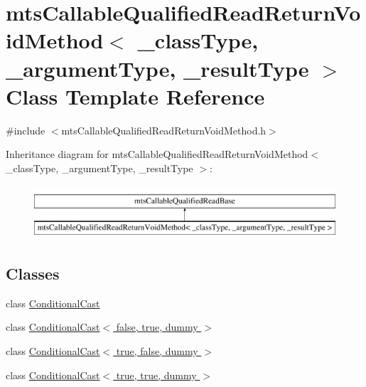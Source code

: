 \hypertarget{classmts_callable_qualified_read_return_void_method}{}\section{mts\+Callable\+Qualified\+Read\+Return\+Void\+Method$<$ \+\_\+class\+Type, \+\_\+argument\+Type, \+\_\+result\+Type $>$ Class Template Reference}
\label{classmts_callable_qualified_read_return_void_method}


{\ttfamily \#include $<$mts\+Callable\+Qualified\+Read\+Return\+Void\+Method.\+h$>$}

Inheritance diagram for mts\+Callable\+Qualified\+Read\+Return\+Void\+Method$<$ \+\_\+class\+Type, \+\_\+argument\+Type, \+\_\+result\+Type $>$\+:\begin{figure}[H]
\begin{center}
\leavevmode
\includegraphics[height=2.000000cm]{d6/dcd/classmts_callable_qualified_read_return_void_method}
\end{center}
\end{figure}
\subsection*{Classes}
\begin{DoxyCompactItemize}
\item 
class \hyperlink{classmts_callable_qualified_read_return_void_method_1_1_conditional_cast}{Conditional\+Cast}
\item 
class \hyperlink{classmts_callable_qualified_read_return_void_method_1_1_conditional_cast_3_01false_00_01true_00_01dummy_01_4}{Conditional\+Cast$<$ false, true, dummy $>$}
\item 
class \hyperlink{classmts_callable_qualified_read_return_void_method_1_1_conditional_cast_3_01true_00_01false_00_01dummy_01_4}{Conditional\+Cast$<$ true, false, dummy $>$}
\item 
class \hyperlink{classmts_callable_qualified_read_return_void_method_1_1_conditional_cast_3_01true_00_01true_00_01dummy_01_4}{Conditional\+Cast$<$ true, true, dummy $>$}
\end{DoxyCompactItemize}
